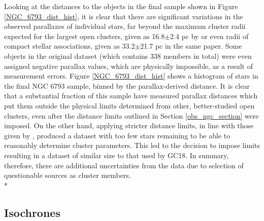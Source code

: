 \documentclass[12pt, a4paper]{report}
\begin{document}
Looking at the distances to the objects in the final sample shown in Figure \ref{NGC_6793_dist_hist}, it is clear that there are significant variations in the observed parallaxes of individual stars, far beyond the maximum cluster radii expected for the largest open clusters, given as 16.8$\pm$2.4 pc by \cite{2006A&A...456..523S} or even radii of compact stellar associations, given as 33.2$\pm$21.7 pc in the same paper. Some objects in the original dataset (which contains 338 members in total) were even assigned negative parallax values, which are physically impossible, as a result of measurement errors. Figure \ref{NGC_6793_dist_hist} shows a histogram of stars in the final NGC 6793 sample, binned by the parallax-derived distance. It is clear that a substantial fraction of this sample have measured parallax distances which put them outside the physical limits determined from other, better-studied open clusters, even after the distance limits outlined in Section \ref{obs_ngc_section} were imposed. On the other hand, applying stricter distance limits, in line with those given by \cite{2006A&A...456..523S}, produced a dataset with too few stars remaining to be able to reasonably determine cluster parameters. This led to the decision to impose limits resulting in a dataset of similar size to that used by GC18. In summary, therefore, there are additional uncertainties from the data due to selection of questionable sources as cluster members. \\*

\subsection{Isochrones}
\end{document}
